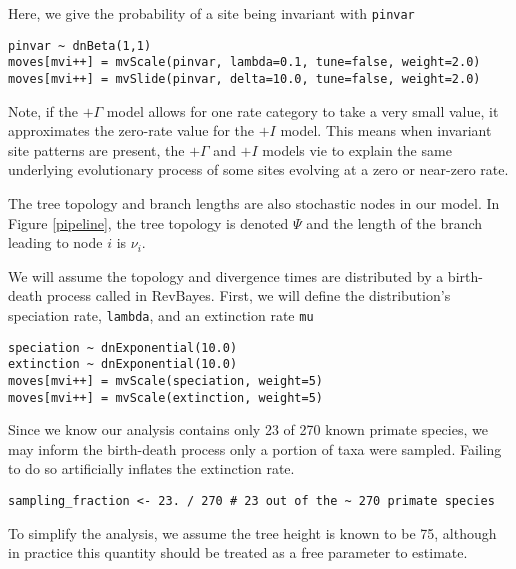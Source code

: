 Here, we give the probability of a site being invariant with {\tt pinvar}
{\tt \begin{snugshade*}
\begin{lstlisting}
pinvar ~ dnBeta(1,1)
moves[mvi++] = mvScale(pinvar, lambda=0.1, tune=false, weight=2.0)
moves[mvi++] = mvSlide(pinvar, delta=10.0, tune=false, weight=2.0)
\end{lstlisting}
\end{snugshade*}}

Note, if the $+\Gamma$ model allows for one rate category to take a very small value, it approximates the zero-rate value for the $+I$ model.
This means when invariant site patterns are present, the $+\Gamma$ and $+I$ models vie to explain the same underlying evolutionary process of some sites evolving at a zero or near-zero rate.

The tree topology and branch lengths are also stochastic nodes in our model. 
In Figure \ref{pipeline}, the tree topology is denoted $\Psi$ and the length of the branch leading to node $i$ is $\nu_i$.

We will assume the topology and divergence times are distributed by a birth-death process called  in RevBayes.
First, we will define the distribution's speciation rate, {\tt lambda}, and an extinction rate {\tt mu}

{\tt \begin{snugshade*}
\begin{lstlisting}
speciation ~ dnExponential(10.0)
extinction ~ dnExponential(10.0)
moves[mvi++] = mvScale(speciation, weight=5)
moves[mvi++] = mvScale(extinction, weight=5)
\end{lstlisting}
\end{snugshade*}}

Since we know our analysis contains only 23 of 270 known primate species, we may inform the birth-death process only a portion of taxa were sampled.
Failing to do so artificially inflates the extinction rate.

{\tt \begin{snugshade*}
\begin{lstlisting}
sampling_fraction <- 23. / 270 # 23 out of the ~ 270 primate species
\end{lstlisting}
\end{snugshade*}}

To simplify the analysis, we assume the tree height is known to be 75, although in practice this quantity should be treated as a free parameter to estimate.

